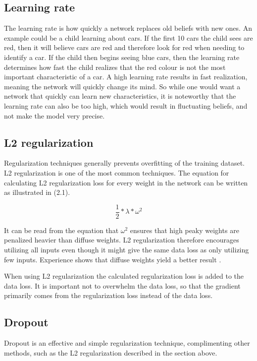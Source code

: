 \subsection{Learning rate}
The learning rate is how quickly a network replaces old beliefs with new ones. An example could be a child learning about cars. If the first 10 cars the child sees are red, then it will believe cars are red and therefore look for red when needing to identify a car. If the child then begins seeing blue cars, then the learning rate determines how fast the child realizes that the red colour is not the most important characteristic of a car. A high learning rate results in fast realization, meaning the network will quickly change its mind. So while one would want a network that quickly can learn new characteristics, it is noteworthy that the learning rate can also be too high, which would result in fluctuating beliefs, and not make the model very precise. 

\subsection{L2 regularization}
Regularization techniques generally prevents overfitting of the training dataset. L2 regularization is one of the most common techniques. The equation for calculating L2 regularization loss for every weight in the network can be written as illustrated in (2.1). 

\begin{equation}
\dfrac{1}{2} * \lambda * \omega^2
\end{equation}

It can be read from the equation that $\omega^2$ ensures that high peaky weights are penalized heavier than diffuse weights. L2 regularization therefore encourages utilizing all inputs even though it might give the same data loss as only utilizing few inputs. Experience shows that diffuse weights yield a better result \citep{LC_cs231n}.

When using L2 regularization the calculated regularization loss is added to the data loss. It is important not to overwhelm the data loss, so that the gradient primarily comes from the regularization loss instead of the data loss.



\subsection{Dropout}
Dropout is an effective and simple regularization technique, complimenting other methods, such as the L2 regularization described in the section above. 

